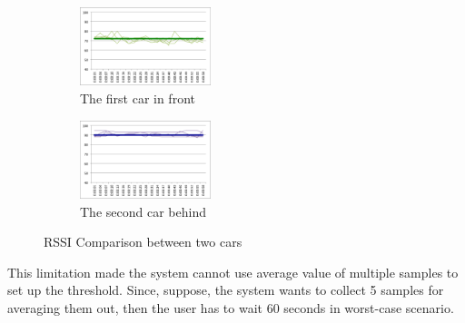 \begin{figure}
	\centering
	\begin{subfigure}[b]{.5\linewidth}
		\centering
		\includegraphics[width=1.5in]{figure/bt_first_car}
		\caption{The first car in front}
		\label{fig:first car}
	\end{subfigure}%
	\begin{subfigure}[b]{.5\linewidth}
		\centering
		\includegraphics[width=1.5in]{figure/bt_second_car}
		\caption{The second car behind}
		\label{fig:second car}
	\end{subfigure}
	\caption{RSSI Comparison between two cars}
	\label{fig:comparison}
\end{figure}

This limitation made the system cannot use average value of multiple samples to set up the threshold. Since, suppose, the system wants to collect 5 samples for averaging them out, then the user has to wait 60 seconds in worst-case scenario.
